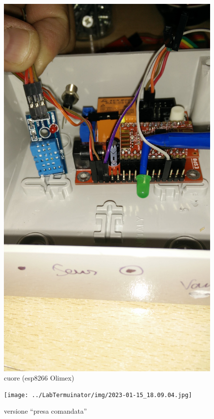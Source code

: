 \documentclass[a4paper,12pt]{article}
\begin{document}
\begin{figure}
	\centering
	\includegraphics[height=0.4\textheight]{../docs/img/2016-03-21_16.06.25}
	\caption{cuore (esp8266 Olimex)}
	\label{fig:cuore}
\end{figure}

\begin{figure}
	\centering
	\texttt{[image: ../LabTermuinator/img/2023-01-15\_18.09.04.jpg]}
	\caption{versione ``presa comandata''}
	\label{fig:presa}
\end{figure}
\end{document}
